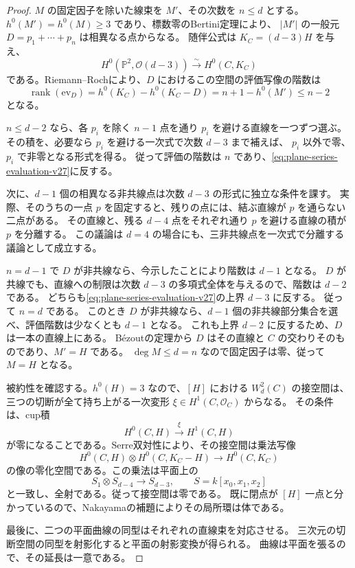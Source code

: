 \begin{proof}
$M$ の固定因子を除いた線束を $M'$、その次数を $n\le d$ とする。
$h^0(M')=h^0(M)\ge3$ であり、標数零のBertini定理により、
$|M'|$ の一般元 $D=p_1+\cdots+p_n$ は相異なる点からなる。
随伴公式は $K_C=(d-3)H$ を与え、
\[
 H^0(\mathbb P^2,\mathcal O(d-3))\xrightarrow{\sim}H^0(C,K_C)
\]
である。Riemann--Rochにより、$D$ におけるこの空間の評価写像の階数は
\begin{equation}\label{eq:plane-series-evaluation-v27}
 \operatorname{rank}(\mathrm{ev}_D)
 =h^0(K_C)-h^0(K_C-D)
 =n+1-h^0(M')\le n-2
\end{equation}
となる。

$n\le d-2$ なら、各 $p_i$ を除く $n-1$ 点を通り $p_i$ を避ける直線を一つずつ選ぶ。
その積を、必要なら $p_i$ を避ける一次式で次数 $d-3$ まで補えば、
$p_i$ 以外で零、$p_i$ で非零となる形式を得る。
従って評価の階数は $n$ であり、\eqref{eq:plane-series-evaluation-v27}に反する。

次に、$d-1$ 個の相異なる非共線点は次数 $d-3$ の形式に独立な条件を課す。
実際、そのうちの一点 $p$ を固定すると、残りの点には、結ぶ直線が $p$ を通らない二点がある。
その直線と、残る $d-4$ 点をそれぞれ通り $p$ を避ける直線の積が $p$ を分離する。
この議論は $d=4$ の場合にも、三非共線点を一次式で分離する議論として成立する。

$n=d-1$ で $D$ が非共線なら、今示したことにより階数は $d-1$ となる。
$D$ が共線でも、直線への制限は次数 $d-3$ の多項式全体を与えるので、階数は $d-2$ である。
どちらも\eqref{eq:plane-series-evaluation-v27}の上界 $d-3$ に反する。
従って $n=d$ である。
このとき $D$ が非共線なら、$d-1$ 個の非共線部分集合を選べ、評価階数は少なくとも $d-1$ となる。
これも上界 $d-2$ に反するため、$D$ は一本の直線上にある。
B\'ezoutの定理から $D$ はその直線と $C$ の交わりそのものであり、$M'=H$ である。
$\deg M\le d=n$ なので固定因子は零、従って $M=H$ となる。

被約性を確認する。$h^0(H)=3$ なので、$[H]$ における $W_d^2(C)$ の接空間は、
三つの切断が全て持ち上がる一次変形 $\xi\in H^1(C,\mathcal O_C)$ からなる。
その条件は、cup積
\[
 H^0(C,H)\xrightarrow{\ \xi\ }H^1(C,H)
\]
が零になることである。Serre双対性により、その接空間は乗法写像
\[
 H^0(C,H)\otimes H^0(C,K_C-H)\longrightarrow H^0(C,K_C)
\]
の像の零化空間である。この乗法は平面上の
\[
 S_1\otimes S_{d-4}\longrightarrow S_{d-3},
 \qquad S=k[x_0,x_1,x_2]
\]
と一致し、全射である。従って接空間は零である。
既に閉点が $[H]$ 一点と分かっているので、Nakayamaの補題によりその局所環は体である。

最後に、二つの平面曲線の同型はそれぞれの直線束を対応させる。
三次元の切断空間の同型を射影化すると平面の射影変換が得られる。
曲線は平面を張るので、その延長は一意である。
\end{proof}

